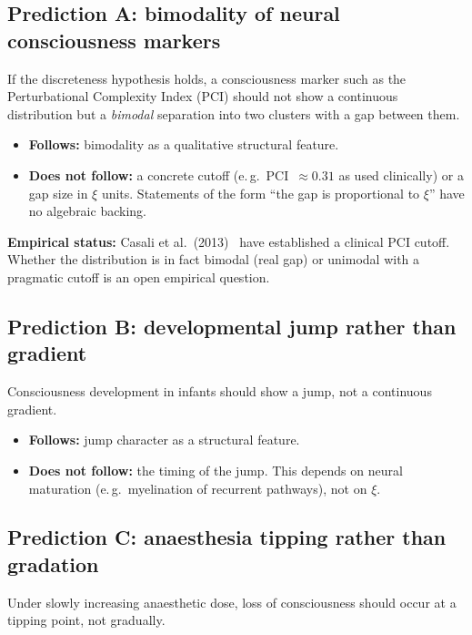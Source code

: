 \subsection{Prediction A: bimodality of neural consciousness markers}\label{sec:predictionA}

If the discreteness hypothesis holds, a consciousness marker such as the Perturbational Complexity Index (PCI) should not show a continuous distribution but a \emph{bimodal} separation into two clusters with a gap between them.

\begin{itemize}
\item \textbf{Follows:} bimodality as a qualitative structural feature.
\item \textbf{Does not follow:} a concrete cutoff (e.\,g.\ PCI~$\approx 0.31$ as used clinically) or a gap size in $\xi$ units. Statements of the form ``the gap is proportional to $\xi$'' have no algebraic backing.
\end{itemize}

\textbf{Empirical status:} Casali et al.~(2013)~\cite{Casali2013} have established a clinical PCI cutoff. Whether the distribution is in fact bimodal (real gap) or unimodal with a pragmatic cutoff is an open empirical question.

\subsection{Prediction B: developmental jump rather than gradient}\label{sec:predictionB}

Consciousness development in infants should show a jump, not a continuous gradient.

\begin{itemize}
\item \textbf{Follows:} jump character as a structural feature.
\item \textbf{Does not follow:} the timing of the jump. This depends on neural maturation (e.\,g.\ myelination of recurrent pathways), not on $\xi$.
\end{itemize}

\subsection{Prediction C: anaesthesia tipping rather than gradation}\label{sec:predictionC}

Under slowly increasing anaesthetic dose, loss of consciousness should occur at a tipping point, not gradually.

